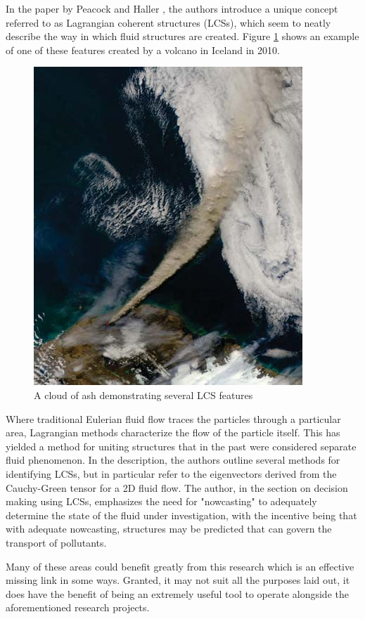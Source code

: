 \documentclass[12pt]{report}
\begin{document}
In the paper by Peacock and Haller \cite{Peacock13}, the authors introduce a unique concept referred to as Lagrangian coherent structures (LCSs), which seem to neatly describe the way in which fluid structures are created. Figure \ref{fig:LCSTigerTail} shows an example of one of these features created by a volcano in Iceland in 2010.
\begin{figure}[!ht]
	\centering
	\includegraphics[scale=0.5]{ash_cloud.png}
	\caption{A cloud of ash demonstrating several LCS features \cite{Peacock13}}
	\label{fig:LCSTigerTail}
\end{figure}
Where traditional Eulerian fluid flow traces the particles through a particular area, Lagrangian methods characterize the flow of the particle itself. This has yielded a method for uniting structures that in the past were considered separate fluid phenomenon. In the description, the authors outline several methods for identifying LCSs, but in particular refer to the eigenvectors derived from the Cauchy-Green tensor for a 2D fluid flow. The author, in the section on decision making using LCSs, emphasizes the need for "nowcasting" to adequately determine the state of the fluid under investigation, with the incentive being that with adequate nowcasting, structures may be predicted that can govern the transport of pollutants.

Many of these areas could benefit greatly from this research which is an effective missing link in some ways. Granted, it may not suit all the purposes laid out, it does have the benefit of being an extremely useful tool to operate alongside the aforementioned research projects. 
\end{document}
